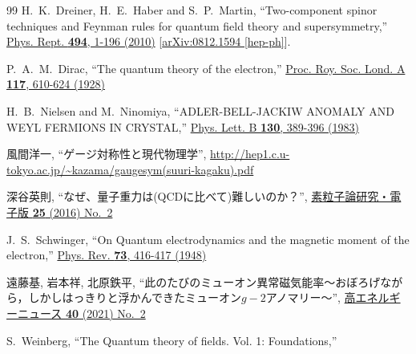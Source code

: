 \documentclass[10pt,a4paper]{jarticle}
\begin{document}
\begin{thebibliography}{99}
H.~K.~Dreiner, H.~E.~Haber and S.~P.~Martin,
``Two-component spinor techniques and Feynman rules for quantum field theory and supersymmetry,''
\href{https://doi.org/10.1016/j.physrep.2010.05.002}{Phys. Rept. \textbf{494}, 1-196 (2010)}
[\href{https://arxiv.org/abs/0812.1594}{arXiv:0812.1594 [hep-ph]}].

P.~A.~M.~Dirac,
``The quantum theory of the electron,''
\href{https://doi.org/10.1098/rspa.1928.0023}{Proc. Roy. Soc. Lond. A \textbf{117}, 610-624 (1928)}

H.~B.~Nielsen and M.~Ninomiya,
``ADLER-BELL-JACKIW ANOMALY AND WEYL FERMIONS IN CRYSTAL,''
\href{https://doi.org/10.1016/0370-2693(83)91529-0}{Phys. Lett. B \textbf{130}, 389-396 (1983)}

風間洋一, ``ゲージ対称性と現代物理学'',
\url{http://hep1.c.u-tokyo.ac.jp/~kazama/gaugesym(suuri-kagaku).pdf}

深谷英則, ``なぜ、量子重力は(QCDに比べて)難しいのか？'',
\href{http://www2.yukawa.kyoto-u.ac.jp/~soken.editorial/sokendenshi/vol25/sokendenshi_2016_25_2.html}
{素粒子論研究・電子版 \textbf{25} (2016) No.~2}

J.~S.~Schwinger,
``On Quantum electrodynamics and the magnetic moment of the electron,''
\href{https://doi.org/10.1103/PhysRev.73.416}{Phys. Rev. \textbf{73}, 416-417 (1948)}

遠藤基, 岩本祥, 北原鉄平,
``此のたびのミューオン異常磁気能率〜おぼろげながら，しかしはっきりと浮かんできたミューオン$g-2$アノマリー〜'',
\href{http://www.jahep.org/hepnews/2021/40-2-2-g2.pdf}{高エネルギーニュース \textbf{40} (2021) No.~2}

S.~Weinberg,
``The Quantum theory of fields. Vol. 1: Foundations,''


\end{thebibliography}
\end{document}
